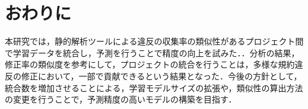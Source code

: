 \documentclass[uplatex,dvipdfmx,a4paper,twocolumn,base=10.5pt,jbase=10.5pt,ja=standard]{bxjsarticle}  %
\begin{document}
\section{おわりに}
本研究では，静的解析ツールによる違反の収集率の類似性があるプロジェクト間で学習データを統合し，予測を行うことで精度の向上を試みた．．分析の結果，修正率の類似度を参考にして，プロジェクトの統合を行うことは，多様な規約違反の修正において，一部で貢献できるという結果となった．今後の方針として，統合数を増加させることによる，学習モデルサイズの拡張や，類似性の算出方法の変更を行うことで，予測精度の高いモデルの構築を目指す．


  
\end{document}
